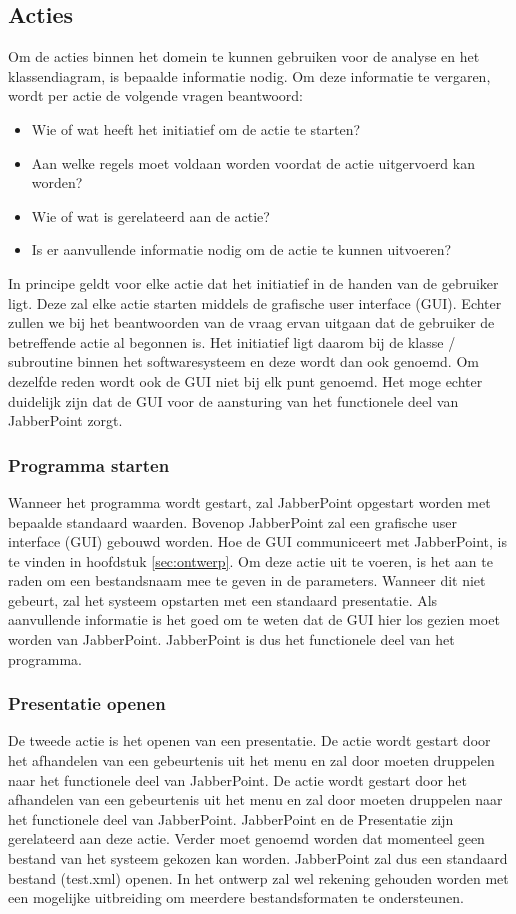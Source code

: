 \documentclass[a4paper]{article}
\begin{document}
\subsection{Acties}
Om de acties binnen het domein te kunnen gebruiken voor de analyse en het klassendiagram, is bepaalde informatie nodig. Om deze informatie te vergaren, wordt per actie de volgende vragen beantwoord:
\begin{itemize}[noitemsep]
\item Wie of wat heeft het initiatief om de actie te starten?
\item Aan welke regels moet voldaan worden voordat de actie uitgervoerd kan worden?
\item Wie of wat is gerelateerd aan de actie?
\item Is er aanvullende informatie nodig om de actie te kunnen uitvoeren?
\end{itemize}

In principe geldt voor elke actie dat het initiatief in de handen van de gebruiker ligt. Deze zal elke actie starten middels de grafische user interface (GUI). Echter zullen we bij het beantwoorden van de vraag ervan uitgaan dat de gebruiker de betreffende actie al begonnen is. Het initiatief ligt daarom bij de klasse / subroutine binnen het softwaresysteem en deze wordt dan ook genoemd. Om dezelfde reden wordt ook de GUI niet bij elk punt genoemd. Het moge echter duidelijk zijn dat de GUI voor de aansturing van het functionele deel van JabberPoint zorgt.

\subsubsection{Programma starten}
Wanneer het programma wordt gestart, zal JabberPoint opgestart worden met bepaalde standaard waarden. Bovenop JabberPoint zal een grafische user interface (GUI) gebouwd worden. Hoe de GUI communiceert met JabberPoint, is te vinden in hoofdstuk \ref{sec:ontwerp}. Om deze actie uit te voeren, is het aan te raden om een bestandsnaam mee te geven in de parameters. Wanneer dit niet gebeurt, zal het systeem opstarten met een standaard presentatie. Als aanvullende informatie is het goed om te weten dat de GUI hier los gezien moet worden van JabberPoint. JabberPoint is dus het functionele deel van het programma.

\subsubsection{Presentatie openen}
\label{subsub:presOpenen}
De tweede actie is het openen van een presentatie. De actie wordt gestart door het afhandelen van een gebeurtenis uit het menu en zal door moeten druppelen naar het functionele deel van JabberPoint. De actie wordt gestart door het afhandelen van een gebeurtenis uit het menu en zal door moeten druppelen naar het functionele deel van JabberPoint. JabberPoint en de Presentatie zijn gerelateerd aan deze actie. Verder moet genoemd worden dat momenteel geen bestand van het systeem gekozen kan worden. JabberPoint zal dus een standaard bestand (test.xml) openen. In het ontwerp zal wel rekening gehouden worden met een mogelijke uitbreiding om meerdere bestandsformaten te ondersteunen.
\end{document}
